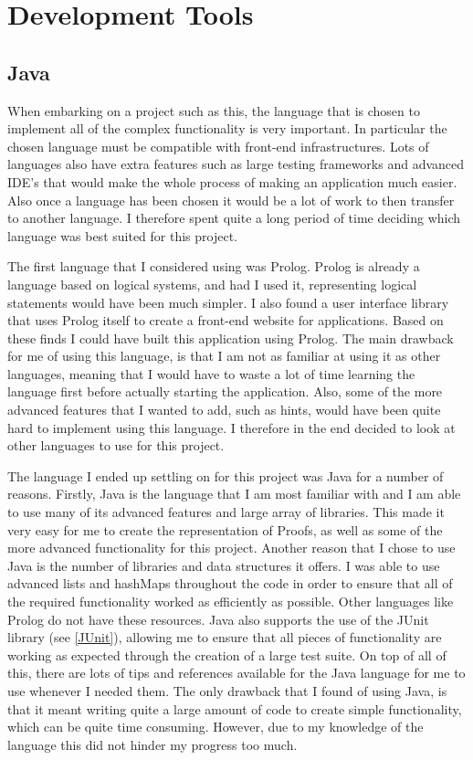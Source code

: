 \pagebreak

\section{Development Tools}

\subsection{Java}

When embarking on a project such as this, the language that is chosen to implement all of the complex functionality is very important. In particular the chosen language must be compatible with front-end infrastructures. Lots of languages also have extra features such as large testing frameworks and advanced IDE's that would make the whole process of making an application much easier. Also once a language has been chosen it would be a lot of work to then transfer to another language. I therefore spent quite a long period of time deciding which language was best suited for this project.

The first language that I considered using was Prolog. Prolog is already a language based on logical systems, and had I used it, representing logical statements would have been much simpler. I also found a user interface library that uses Prolog itself to create a front-end website for applications. Based on these finds I could have built this application using Prolog. The main drawback for me of using this language, is that I am not as familiar at using it as other languages, meaning that I would have to waste a lot of time learning the language first before actually starting the application. Also, some of the more advanced features that I wanted to add, such as hints, would have been quite hard to implement using this language. I therefore in the end decided to look at other languages to use for this project. 

The language I ended up settling on for this project was Java for a number of reasons. Firstly, Java is the language that I am most familiar with and I am able to use many of its advanced features and large array of libraries. This made it very easy for me to create the representation of Proofs, as well as some of the more advanced functionality for this project. Another reason that I chose to use Java is the number of libraries and data structures it offers. I was able to use advanced lists and hashMaps throughout the code in order to ensure that all of the required functionality worked as efficiently as possible. Other languages like Prolog do not have these resources. Java also supports the use of the JUnit library (see \ref{JUnit}), allowing me to ensure that all pieces of functionality are working as expected through the creation of a large test suite. On top of all of this, there are lots of tips and references available for the Java language for me to use whenever I needed them. The only drawback that I found of using Java, is that it meant writing quite a large amount of code to create simple functionality, which can be quite time consuming. However, due to my knowledge of the language this did not hinder my progress too much. 


